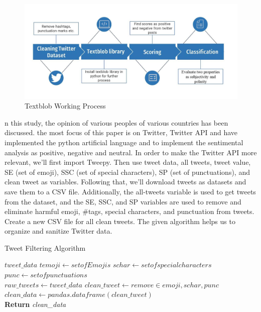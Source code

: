 \begin{figure}[H]
    \centering
    \includegraphics[scale=.45]{img3/Textblob Working Process.png}
    \caption{Textblob Working Process}
    \label{fig:Textblob}
\end{figure}

n this study, the opinion of various peoples of various countries has been discussed. the most focus of this paper is on Twitter, Twitter API and have implemented the python artificial language and to implement the sentimental analysis as positive, negative and neutral. 
In order to make the Twitter API more relevant, we'll first import Tweepy. Then use tweet data, all tweets, tweet value, SE (set of emoji), SSC (set of special characters), SP (set of punctuations), and clean tweet as variables. Following that, we'll download tweets as datasets and save them to a CSV file. Additionally, the all-tweets variable is used to get tweets from the dataset, and the SE, SSC, and SP variables are used to remove and eliminate harmful emoji, \#tags, special characters, and punctuation from tweets. Create a new CSV file for all clean tweets. The given algorithm helps us to organize and sanitize Twitter data. \\

\begin{algorithm}
\caption{Tweet Filtering Algorithm}\label{alg:Filter}
\begin{algorithmic}[1]
\Require $tweet\_data$
\State $temoji \gets set of Emojis$
\State $schar \gets set of special characters$
\State $punc \gets set of punctuations$
\\
\State $raw\_tweets \gets tweet\_data$
        \State $clean\_tweet \gets remove \in emoji, schar, punc$
    \EndIf
\EndFor
\State $clean\_data \gets pandas.dataframe(clean\_tweet)$
\\\textbf{Return}
\textit{clean\_data}
\end{algorithmic}
\end{algorithm}



